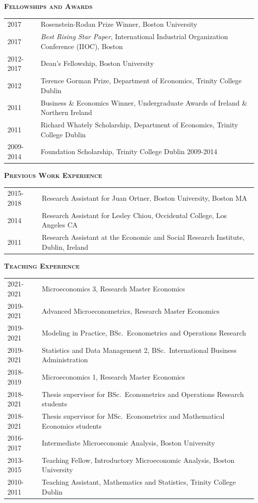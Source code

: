 \documentclass[11pt,overlapped,line,letterpaper]{article}
\newcommand{\cvsec}[1]{\vspace{\baselineskip}\textbf{\textsc{#1}}}
\begin{document}
\cvsec{Fellowships and Awards}\smallskip \\
\begin{tabularx}{\textwidth}{lX}
  2017 & Rosenstein-Rodan Prize Winner, Boston University \\
2017 & \emph{Best Rising Star Paper}, International Industrial Organization Conference (IIOC), Boston \\
  2012-2017 & Dean's Fellowship, Boston University \\
  2012 & Terence Gorman Prize, Department of Economics, Trinity College Dublin \\
  2011 & Business \& Economics Winner, Undergraduate Awards of Ireland \& Northern Ireland \\
  2011 & Richard Whately Scholarship, Department of Economics, Trinity College Dublin \\
  2009-2014 &  Foundation Scholarship, Trinity College Dublin 2009-2014 \\
\end{tabularx}

\newpage
\cvsec{Previous Work Experience}\smallskip \\
\begin{tabularx}{\textwidth}{lX}
  2015-2018    & Research Assistant for Juan Ortner, Boston University, Boston MA \\
 2014  & Research Assistant for Lesley Chiou, Occidental College, Los Angeles CA \\
 2011  & Research Assistant at the Economic and Social Research Institute, Dublin, Ireland
\end{tabularx}

\cvsec{Teaching Experience}\smallskip \\
\begin{tabularx}{\textwidth}{lX}
  2021-2021 & Microeconomics 3, Research Master Economics \\
  2019-2021 & Advanced Microeconometrics, Research Master Economics \\
  2019-2021 & Modeling in Practice, BSc.~Econometrics and Operations Research\\
  2019-2021 & Statistics and Data Management 2, BSc.~International Business Administration \\
  2018-2019 & Microeconomics 1, Research Master Economics \\
  2018-2021 & Thesis supervisor for BSc.~Econometrics and Operations Research students\\
  2018-2021 & Thesis supervisor for MSc.~Econometrics and Mathematical Economics students\\
  2016-2017 & Intermediate Microeconomic Analysis, Boston University \\
  2013-2015 & Teaching Fellow, Introductory Microeconomic Analysis, Boston University \\
  2010-2011 & Teaching Assistant, Mathematics and Statistics, Trinity College Dublin \\
\end{tabularx}
\end{document}
